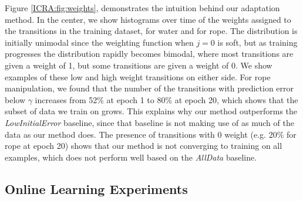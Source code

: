 Figure \ref{ICRA:fig:weights}, demonstrates the intuition behind our adaptation method. In the center, we show histograms over time of the weights assigned to the transitions in the training dataset, for water and for rope. The distribution is initially unimodal since the weighting function when $j=0$ is soft, but as training progresses the distribution rapidly becomes bimodal, where most transitions are given a weight of 1, but some transitions are given a weight of 0. We show examples of these low and high weight transitions on either side. For rope manipulation, we found that the number of the transitions with prediction error below $\gamma$ increases from 52\% at epoch 1 to 80\% at epoch 20, which shows that the subset of data we train on grows. This explains why our method outperforms the \textit{LowInitialError} baseline, since that baseline is not making use of as much of the data as our method does. The presence of transitions with 0 weight (e.g. 20\% for rope at epoch 20) shows that our method is not converging to training on all examples, which does not perform well based on the \textit{AllData} baseline.

\subsection{Online Learning Experiments}
\label{ICRA:sec:online_learning_experiments}

